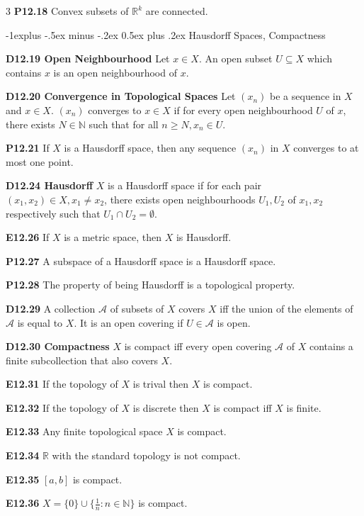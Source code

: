 \documentclass[10pt, landscape]{article}
\makeatletter
\renewcommand{\section}{\@startsection{section}{1}{0mm}%
                                {-1ex plus -.5ex minus -.2ex}%
                                {0.5ex plus .2ex}%
                                {\normalfont\large\bfseries}}
\renewcommand{\section}{\@startsection{section}{2}{0mm}%
                                {-1explus -.5ex minus -.2ex}%
                                {0.5ex plus .2ex}%
                                {\normalfont\normalsize\bfseries}}
\makeatother
\begin{document}
\begin{multicols*}{3}
\textbf{P12.18} Convex subsets of $\mathbb{R}^k$ are connected.

\section{Hausdorff Spaces, Compactness}

\textbf{D12.19 Open Neighbourhood} Let $x \in X$. An open subset $U \subseteq X$ which contains $x$ is an open neighbourhood of $x$.

\textbf{D12.20 Convergence in Topological Spaces} Let $(x_n)$ be a sequence in $X$ and $x \in X$. $(x_n)$ converges to $x \in X$ if for every open neighbourhood $U$ of $x$, there exists $N \in \mathbb{N}$ such that for all $n \geq N, x_n \in U$.

\textbf{P12.21} If $X$ is a Hausdorff space, then any sequence $(x_n)$ in $X$ converges to at most one point.

\textbf{D12.24 Hausdorff} $X$ is a Hausdorff space if for each pair $(x_1,x_2) \in X, x_1 \neq x_2$, there exists open neighbourhoods $U_1, U_2$ of $x_1, x_2$ respectively such that $U_1 \cap U_2 = \emptyset$.

\textbf{E12.26} If $X$ is  a metric space, then $X$ is Hausdorff.

\textbf{P12.27} A subspace of a Hausdorff space is a Hausdorff space.

\textbf{P12.28} The property of being Hausdorff is a topological property.

\textbf{D12.29} A collection $\mathcal{A}$ of subsets of $X$ covers $X$ iff the union of the elements of $\mathcal{A}$ is equal to $X$. It is an open covering if $U \in \mathcal{A}$ is open.

\textbf{D12.30 Compactness} $X$ is compact iff every open covering $\mathcal{A}$ of $X$ contains a finite subcollection that also covers $X$.

\textbf{E12.31} If the topology of $X$ is trival then $X$ is compact.

\textbf{E12.32} If the topology of $X$ is discrete then $X$ is compact iff $X$ is finite.

\textbf{E12.33} Any finite topological space $X$ is compact.

\textbf{E12.34} $\mathbb{R}$ with the standard topology is not compact.

\textbf{E12.35} $[a,b]$ is compact.

\textbf{E12.36} $X=\{0\} \cup \{\frac{1}{n} : n \in \mathbb{N}\}$ is compact.


\end{multicols*}
\end{document}
